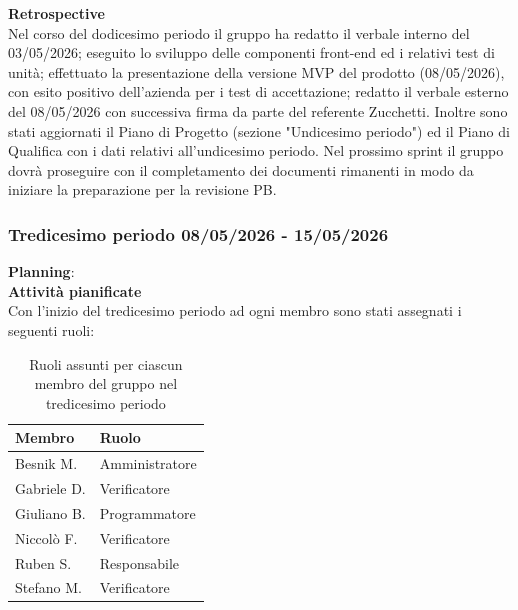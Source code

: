 \documentclass[a4paper,10pt]{article}
\begin{document}
\textbf{Retrospective} \\
Nel corso del dodicesimo periodo il gruppo ha redatto il verbale interno del 03/05/2026; eseguito lo sviluppo delle componenti front-end ed i relativi test di unità; effettuato la presentazione della versione MVP del prodotto (08/05/2026), con esito positivo dell'azienda per i test di accettazione; redatto il verbale esterno del 08/05/2026 con successiva firma da parte del referente Zucchetti. Inoltre sono stati aggiornati il Piano di Progetto (sezione "Undicesimo periodo") ed il Piano di Qualifica con i dati relativi all'undicesimo periodo.
Nel prossimo sprint il gruppo dovrà proseguire con il completamento dei documenti rimanenti in modo da iniziare la preparazione per la revisione PB.

\subsubsection{Tredicesimo periodo 08/05/2026 - 15/05/2026}
\textbf{Planning}: \\
\textbf{Attività pianificate} \\ Con l'inizio del tredicesimo periodo ad ogni membro sono stati assegnati i seguenti ruoli:
\begin{table}[H]
  \centering
  \begin{tabular}{|l|l|}
    \hline
    \textbf{Membro} & \textbf{Ruolo} \\
    \hline
    Besnik M.  & Amministratore \\
    \hline
    Gabriele D.  & Verificatore \\
    \hline
    Giuliano B. & Programmatore \\
    \hline
    Niccolò F. & Verificatore \\
    \hline
    Ruben S. & Responsabile \\
    \hline
    Stefano M.  & Verificatore \\
    \hline
  \end{tabular}
  \caption{Ruoli assunti per ciascun membro del gruppo nel tredicesimo periodo}
\end{table}
\end{document}
